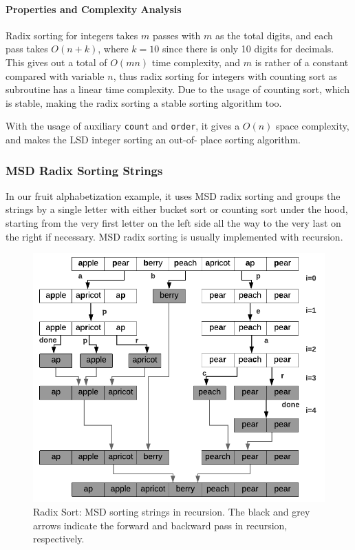 \documentclass[../main.tex]{subfiles}
\begin{document}
\paragraph{Properties and Complexity Analysis} 
Radix sorting for integers takes $m$ passes with $m$ as the total digits, and each pass takes $O(n+k)$, where $k=10$ since there is only 10 digits for decimals. This gives out a total of $O(mn)$ time complexity, and $m$ is rather of a constant compared with variable $n$, thus radix sorting for integers with counting sort as subroutine has a linear time complexity. Due to the usage of counting sort, which is stable, making the radix sorting a stable sorting algorithm too.

With  the usage of auxiliary \texttt{count} and \texttt{order}, it gives a $O(n)$ space complexity, and makes the LSD integer sorting an out-of- place sorting algorithm. 
\subsubsection{MSD Radix Sorting Strings}
In our fruit alphabetization example,  it uses MSD radix sorting and groups the strings by a single letter with either bucket sort or counting sort under the hood,  starting from the very first letter on the left side all the way to the very last on the right if necessary. MSD radix sorting is usually implemented with recursion. 

\begin{figure}[!ht]
    \centering
    \includegraphics[width=0.9\columnwidth]{fig/msd_radix_string_sort.png}
    \caption{Radix Sort: MSD sorting strings in recursion. The black and grey arrows indicate the forward and backward pass in recursion, respectively. }
        \label{fig:msd_radix_string_sort}
\end{figure}
\end{document}
